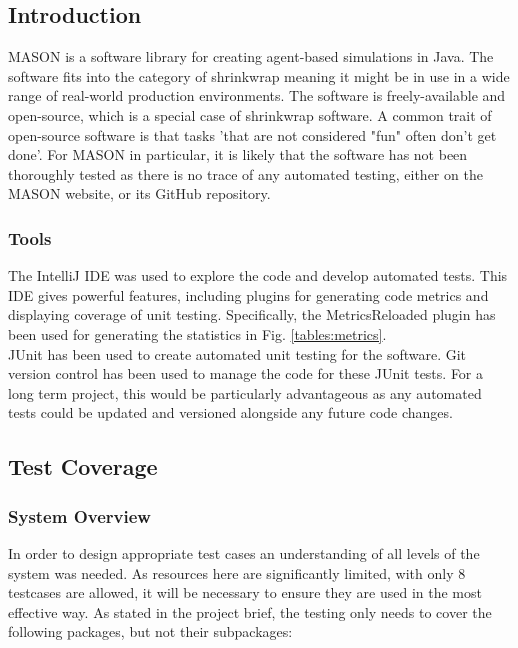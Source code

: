 \documentclass[11pt]{article}
\begin{document}
\subsection{Introduction}
MASON is a software library for creating agent-based simulations in Java. 
The software fits into the category of shrinkwrap meaning it might be in use in a wide range of real-world production environments. The software is freely-available and open-source, which is a special case of shrinkwrap software. A common trait of open-source software is that tasks 'that are not considered "fun" often don't get done'.\cite{five_worlds}
For MASON in particular, it is likely that the software has not been thoroughly tested as there is no trace of any automated testing, either on the MASON website, or its GitHub repository.


\subsubsection{Tools}
The IntelliJ IDE was used to explore the code and develop automated tests. This IDE gives powerful features, including plugins for generating code metrics and displaying coverage of unit testing.
Specifically, the MetricsReloaded plugin\cite{metrics_reloaded} has been used for generating the statistics in Fig. \ref{tables:metrics}.
\\

JUnit has been used to create automated unit testing for the software.
Git version control has been used to manage the code for these JUnit tests.
For a long term project, this would be particularly advantageous as any automated tests could be updated and versioned alongside any future code changes.

\subsection{Test Coverage}
\subsubsection{System Overview}
In order to design appropriate test cases an understanding of all levels of the system was needed. As resources here are significantly limited, with only 8 testcases are allowed, it will be necessary to ensure they are used in the most effective way.
As stated in the project brief, the testing only needs to cover the following packages, but not their subpackages:
\end{document}
